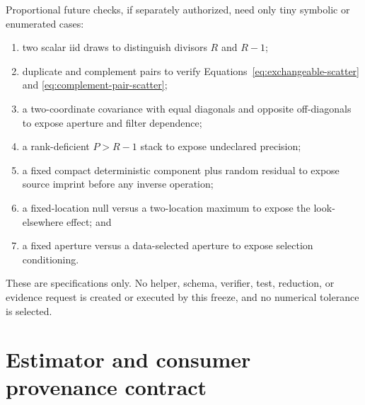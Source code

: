 \documentclass[11pt]{article}
\begin{document}
Proportional future checks, if separately authorized, need only tiny symbolic
or enumerated cases:
\begin{enumerate}
\item two scalar iid draws to distinguish divisors $R$ and $R-1$;
\item duplicate and complement pairs to verify
Equations~\eqref{eq:exchangeable-scatter} and
\eqref{eq:complement-pair-scatter};
\item a two-coordinate covariance with equal diagonals and opposite
off-diagonals to expose aperture and filter dependence;
\item a rank-deficient $P>R-1$ stack to expose undeclared precision;
\item a fixed compact deterministic component plus random residual to expose
source imprint before any inverse operation;
\item a fixed-location null versus a two-location maximum to expose the
look-elsewhere effect; and
\item a fixed aperture versus a data-selected aperture to expose selection
conditioning.
\end{enumerate}
These are specifications only.  No helper, schema, verifier, test, reduction,
or evidence request is created or executed by this freeze, and no numerical
tolerance is selected.

\section{Estimator and consumer provenance contract}
\end{document}
